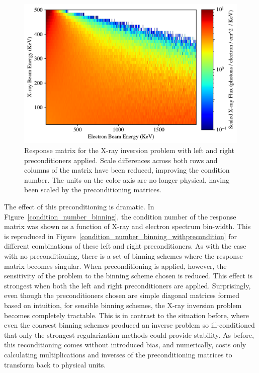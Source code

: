 \begin{figure}[p]
    \centering
    \includegraphics[width=\textwidth]{figures/chapter_4/matrix_scaling_plot/matrix_scaling_plot_transformed.pdf}
    \caption{Response matrix for the X-ray inversion problem with left and right preconditioners applied. Scale differences across both rows and columns of the matrix have been reduced, improving the condition number. The units on the color axis are no longer physical, having been scaled by the preconditioning matrices.}
    \label{matrix_scaling_plot_transformed}
\end{figure}

The effect of this preconditioning is dramatic. In Figure~\ref{condition_number_binning}, the condition number of the response matrix was shown as a function of X-ray and electron spectrum bin-width. This is reproduced in Figure~\ref{condition_number_binning_withprecondition} for different combinations of these left and right preconditioners. As with the case with no preconditioning, there is a set of binning schemes where the response matrix becomes singular. When preconditioning is applied, however, the sensitivity of the problem to the binning scheme chosen is reduced. This effect is strongest when both the left and right preconditioners are applied. Surprisingly, even though the preconditioners chosen are simple diagonal matrices formed based on intuition, for sensible binning schemes, the X-ray inversion problem becomes completely tractable. This is in contrast to the situation before, where even the coarsest binning schemes produced an inverse problem so ill-conditioned that only the strongest regularization methods could provide stability. As before, this reconditioning comes without introduced bias, and numerically, costs only calculating multiplications and inverses of the preconditioning matrices to transform back to physical units. 

